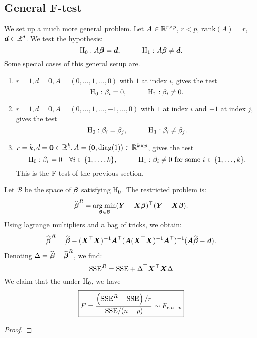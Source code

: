 \subsection{General F-test}
We set up a much more general problem. Let $A\in\mathbb{R}^{r\times p}$, $r<p$, $\mathrm{rank}(A)=r$, $\boldsymbol{d}\in\mathbb{R}^d$. We test the hypothesis:
$$
    \mathrm{H}_0 : A\boldsymbol{\beta} = \boldsymbol{d}, 
    \quad\quad\quad
    \mathrm{H}_1 : A\boldsymbol{\beta} \ne \boldsymbol{d}.
$$
Some special cases of this general setup are.
\begin{enumerate}[label=\textbullet]
    \item $r=1, d=0, A=(0, \dots, 1, \dots, 0)$ with $1$ at index $i$, gives the test 
    $$
        \mathrm{H}_0 : \beta_i = 0, 
        \quad\quad\quad
        \mathrm{H}_1 : \beta_i \ne 0.
    $$
    \item $r=1, d=0, A=(0, \dots, 1, \dots, -1, \dots, 0)$ with $1$ at index $i$ and $-1$ at index $j$, gives the test 
    $$
        \mathrm{H}_0 : \beta_i = \beta_j,
        \quad\quad\quad
        \mathrm{H}_1 : \beta_i \ne \beta_j.
    $$
    \item $r=k, d=\boldsymbol{0}\in\mathbb{R}^k, A=(\boldsymbol{0}, \mathrm{diag}(1))\in\mathbb{R}^{k\times p}$, gives the test 
    $$
        \mathrm{H}_0 : \beta_i = 0 \quad\forall i\in\{1,\dots,k\},
        \quad\quad\quad
        \mathrm{H}_1 : \beta_i \ne 0 \textrm{ for some } i\in\{1,\dots,k\}.
    $$
    This is the F-test of the previous section.
\end{enumerate}
Let $\mathcal{B}$ be the space of $\boldsymbol{\beta}$ satisfying $\mathrm{H}_0$. The restricted problem is:
$$
    \widehat{\boldsymbol{\beta}}^R = \operatorname*{arg\,min}_{\boldsymbol{\beta}\in\mathcal{B}}(\boldsymbol{Y}-\boldsymbol{X}\boldsymbol{\beta})^\top(\boldsymbol{Y}-\boldsymbol{X}\boldsymbol{\beta}).
$$
Using lagrange multipliers and a bag of tricks, we obtain:
$$
    \widehat{\boldsymbol{\beta}}^R = \widehat{\boldsymbol{\beta}} - (\boldsymbol{X}^\top\boldsymbol{X})^{-1}\boldsymbol{A}^\top(\boldsymbol{A}(\boldsymbol{X}^\top\boldsymbol{X})^{-1}\boldsymbol{A}^\top)^{-1}(\boldsymbol{A}\widehat{\boldsymbol{\beta}}-\boldsymbol{d}).
$$
Denoting $\Delta = \widehat{\boldsymbol{\beta}}-\widehat{\boldsymbol{\beta}}^R$, we find:
$$
    \mathrm{SSE}^R = \mathrm{SSE} + \Delta^\top\boldsymbol{X}^\top\boldsymbol{X}\Delta
$$
We claim that the under $\mathrm{H}_0$, we have
\begin{equation}
    \boxed{F = \frac{\left( \mathrm{SSE}^R-\mathrm{SSE} \right) / r}{\mathrm{SSE}/(n-p)} \sim F_{r, n-p}}    
\end{equation}
\begin{proof}
\end{proof}


